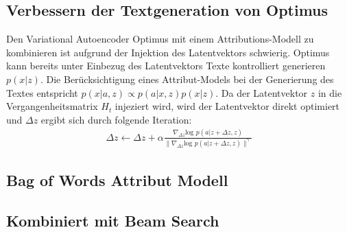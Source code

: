 \subsection{Verbessern der Textgeneration von Optimus}
Den Variational Autoencoder Optimus mit einem Attributions-Modell zu kombinieren ist aufgrund der Injektion des Latentvektors schwierig.
Optimus kann bereits unter Einbezug des Latentvektors Texte kontrolliert generieren $p(x|z)$.
Die Berücksichtigung eines Attribut-Models bei der Generierung des Textes entspricht $p(x|a,z) \propto p(a|x,z)p(x|z)$.%
Da der Latentvektor $z$ in die Vergangenheitsmatrix $H_t$ injeziert wird, wird der Latentvektor direkt optimiert und $\Delta z$ ergibt sich durch folgende Iteration:
\begin{align*}
    \Delta z \leftarrow \Delta z + \alpha \frac{\nabla_{\Delta z} \text{log }p(a|z+\Delta z,z)}{\| \nabla_{\Delta z} \text{log }p(a|z+\Delta z,z)\|^\gamma}
\end{align*}


\subsection{Bag of Words Attribut Modell}

\subsection{Kombiniert mit Beam Search}

\pagebreak
